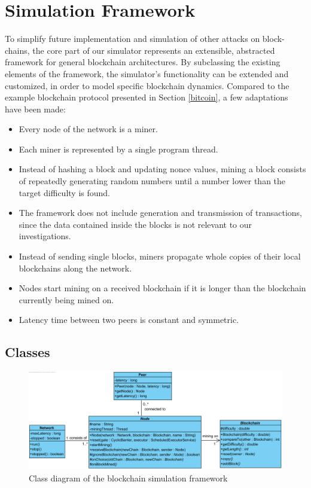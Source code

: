 \documentclass[a4paper,12pt,twoside]{report}
\begin{document}
\section{Simulation Framework}
To simplify future implementation and simulation of other attacks on block-chains, the core part of our simulator represents an extensible, abstracted framework for general blockchain architectures. By subclassing the existing elements of the framework, the simulator's functionality can be extended and customized, in order to model specific blockchain dynamics. Compared to the example blockchain protocol presented in Section \ref{bitcoin}, a few adaptations have been made:
\begin{itemize}
\item Every node of the network is a miner.
\item Each miner is represented by a single program thread.
\item Instead of hashing a block and updating nonce values, mining a block consists of repeatedly generating random numbers until a number lower than the target difficulty is found.
\item The framework does not include generation and transmission of transactions, since the data contained inside the blocks is not relevant to our investigations.
\item Instead of sending single blocks, miners propagate whole copies of their local blockchains along the network.
\item Nodes start mining on a received blockchain if it is longer than the blockchain currently being mined on.
\item Latency time between two peers is constant and symmetric.
\end{itemize}
\subsection{Classes}
\begin{figure}[ht]
	\centering
  \includegraphics[width=\textwidth]{Framework.png}
	\caption{Class diagram of the blockchain simulation framework}
	\label{framework}
\end{figure}
\end{document}
